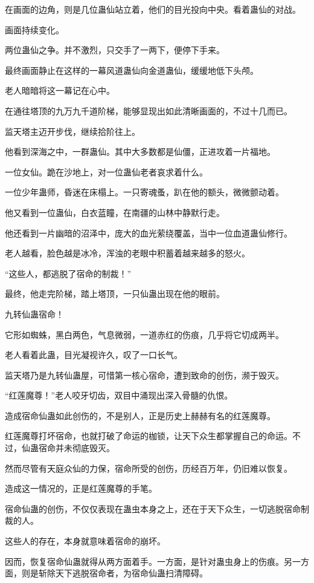 \begin{this_body}
在画面的边角，则是几位蛊仙站立着，他们的目光投向中央。看着蛊仙的对战。

画面持续变化。

两位蛊仙之争。并不激烈，只交手了一两下，便停下手来。

最终画面静止在这样的一幕风道蛊仙向金道蛊仙，缓缓地低下头颅。

老人暗暗将这一幕记在心中。

在通往塔顶的九万九千道阶梯，能够显现出如此清晰画面的，不过十几而已。

监天塔主迈开步伐，继续拾阶往上。

他看到深海之中，一群蛊仙。其中大多数都是仙僵，正进攻着一片福地。

一位女仙。跪在沙地上，对一位蛊仙老者哀求着什么。

一位少年蛊师，昏迷在床榻上。一只寄魂蚤，趴在他的额头，微微颤动着。

他又看到一位蛊仙，白衣蓝瞳，在南疆的山林中静默行走。

他还看到一片幽暗的沼泽中，庞大的血光萦绕覆盖，当中一位血道蛊仙修行。

老人越看，脸色越是冰冷，浑浊的老眼中积蓄着越来越多的怒火。

“这些人，都逃脱了宿命的制裁！”

最终，他走完阶梯，踏上塔顶，一只仙蛊出现在他的眼前。

九转仙蛊宿命！

它形如蜘蛛，黑白两色，气息微弱，一道赤红的伤痕，几乎将它切成两半。

老人看着此蛊，目光凝视许久，叹了一口长气。

监天塔乃是九转仙蛊屋，可惜第一核心宿命，遭到致命的创伤，濒于毁灭。

“红莲魔尊！”老人咬牙切齿，双目中涌现出深入骨髓的仇恨。

造成宿命仙蛊如此创伤的，不是别人，正是历史上赫赫有名的红莲魔尊。

红莲魔尊打坏宿命，也就打破了命运的枷锁，让天下众生都掌握自己的命运。不过，仙蛊宿命并未彻底毁灭。

然而尽管有天庭众仙的力保，宿命所受的创伤，历经百万年，仍旧难以恢复。

造成这一情况的，正是红莲魔尊的手笔。

宿命仙蛊的创伤，不仅仅表现在蛊虫本身之上，还在于天下众生，一切逃脱宿命制裁的人。

这些人的存在，本身就意味着宿命的崩坏。

因而，恢复宿命仙蛊就得从两方面着手。一方面，是针对蛊虫身上的伤痕。另一方面，则是斩除天下逃脱宿命者，为宿命仙蛊扫清障碍。


\end{this_body}
